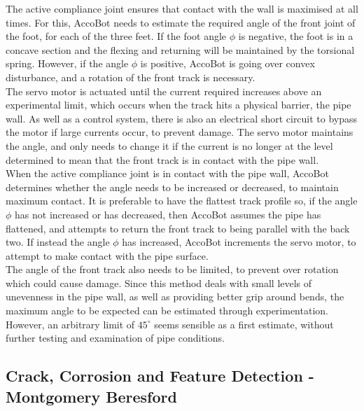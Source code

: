 \documentclass[11pt]{article}		%
\begin{document}
			The active compliance joint ensures that contact with the wall is maximised at all times.
			For this, AccoBot needs to estimate the required angle of the front joint of the foot, for each of the three feet.
			If the foot angle $\phi$ is negative, the foot is in a concave section and the flexing and returning will be maintained by the torsional spring.
			However, if the angle $\phi$ is positive, AccoBot is going over convex disturbance, and a rotation of the front track is necessary.
			\\
	        \hspace*{2ex}The servo motor is actuated until the current required increases above an experimental limit, which occurs when the track hits a physical barrier, the pipe wall.
			As well as a control system, there is also an electrical short circuit to bypass the motor if large currents occur, to prevent damage.
			The servo motor maintains the angle, and only needs to change it if the current is no longer at the level determined to mean that the front track is in contact with the pipe wall.
			\\
	        \hspace*{2ex}When the active compliance joint is in contact with the pipe wall, AccoBot determines whether the angle needs to be increased or decreased, to maintain maximum contact.
			It is preferable to have the flattest track profile so, if the angle $\phi$ has not increased or has decreased, then AccoBot assumes the pipe has flattened, and attempts to return the front track to being parallel with the back two.
			If instead the angle $\phi$ has increased, AccoBot increments the servo motor, to attempt to make contact with the pipe surface.
			\\
	        \hspace*{2ex}The angle of the front track also needs to be limited, to prevent over rotation which could cause damage.
			Since this method deals with small levels of unevenness in the pipe wall, as well as providing better grip around bends, the maximum angle to be expected can be estimated through experimentation.
			However, an arbitrary limit of $45^\circ$ seems sensible as a first estimate, without further testing and examination of pipe conditions.
				
		\subsection[Crack, Corrosion and Feature Detection]{Crack, Corrosion and Feature Detection - Montgomery Beresford} \label{featureDetection}\label{visual}
		
\end{document}
